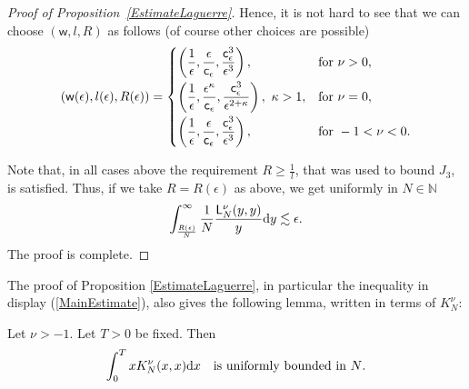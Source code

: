 \begin{proof}[Proof of Proposition~\ref{EstimateLaguerre}]
Hence, it is not hard to see that we can choose $(\mathsf{w},l,R)$ as follows (of course other choices are possible)
\begin{gather}\label{ChoiceOfConstants}
(\mathsf{w}(\epsilon),l(\epsilon),R(\epsilon))=\begin{cases}
\displaystyle \left(\frac{1}{\epsilon},\frac{\epsilon}{\mathsf{c}_{\epsilon}}, \frac{\mathsf{c}_{\epsilon}^3}{\epsilon^3}\right), &\text{for } \nu>0,\vspace{1mm}\\
\displaystyle\left(\frac{1}{\epsilon},\frac{\epsilon^{\kappa}}{\mathsf{c}_{\epsilon}}, \frac{\mathsf{c}_{\epsilon}^3}{\epsilon^{2+\kappa}}\right), \ \kappa>1, &\text{for } \nu=0,\vspace{1mm}\\
\displaystyle\left(\frac{1}{\epsilon},\frac{\epsilon}{\mathsf{c}_{\epsilon}}, \frac{\mathsf{c}_{\epsilon}^3}{\epsilon^3}\right), &\text{for } -1<\nu<0.
\end{cases}
\end{gather}

Note that, in all cases above the requirement $R\ge \frac{1}{l}$, that was used to bound $J_3$, is satisfied. Thus, if we take $R=R(\epsilon)$ as above, we get uniformly in $N \in \mathbb{N}$
\begin{gather*}
\int_{\frac{R(\epsilon)}{N}}^{\infty}\frac{1}{N}\frac{\mathsf{L}_N^{\nu}(y,y)}{y}{\rm d}y \lesssim \epsilon.
\end{gather*}
The proof is complete.
\end{proof}

The proof of Proposition \ref{EstimateLaguerre}, in particular the inequality in display (\ref{MainEstimate}), also gives the following lemma, written in terms of $K_N^{\nu}$:

\begin{Lemma}\label{LemmaUniformBoundedness}
Let $\nu>-1$. Let $T>0$ be fixed. Then
\begin{gather*}
\int_{0}^{T}xK^{\nu}_N(x,x){\rm d}x \quad \text{is uniformly bounded in $N$}.
\end{gather*}
\end{Lemma}

